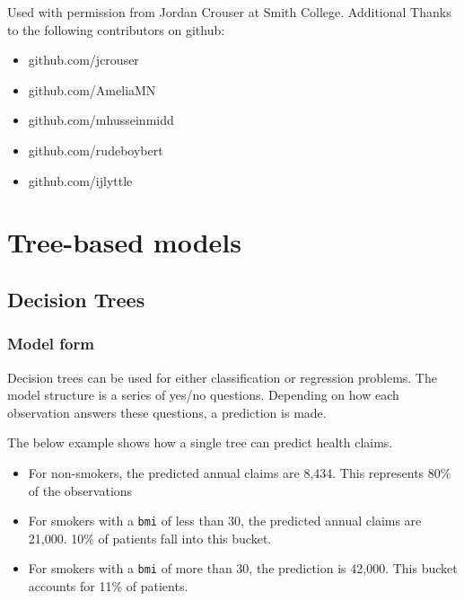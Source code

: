 \documentclass[
  openany]{book}
\providecommand{\tightlist}{%
  \setlength{\itemsep}{0pt}\setlength{\parskip}{0pt}}
\begin{document}
Used with permission from Jordan Crouser at Smith College. Additional Thanks to the following contributors on github:

\begin{itemize}
\tightlist
\item
  github.com/jcrouser
\item
  github.com/AmeliaMN
\item
  github.com/mhusseinmidd
\item
  github.com/rudeboybert
\item
  github.com/ijlyttle
\end{itemize}

\hypertarget{tree-based-models}{%
\chapter{Tree-based models}\label{tree-based-models}}

\hypertarget{decision-trees}{%
\section{Decision Trees}\label{decision-trees}}

\hypertarget{model-form}{%
\subsection{Model form}\label{model-form}}

Decision trees can be used for either classification or regression problems. The model structure is a series of yes/no questions. Depending on how each observation answers these questions, a prediction is made.

The below example shows how a single tree can predict health claims.

\begin{itemize}
\tightlist
\item
  For non-smokers, the predicted annual claims are 8,434. This represents 80\% of the observations
\item
  For smokers with a \texttt{bmi} of less than 30, the predicted annual claims are 21,000. 10\% of patients fall into this bucket.
\item
  For smokers with a \texttt{bmi} of more than 30, the prediction is 42,000. This bucket accounts for 11\% of patients.
\end{itemize}
\end{document}
